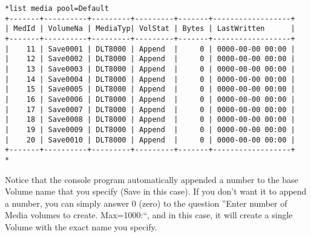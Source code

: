 \footnotesize
\begin{verbatim}
*list media pool=Default
+-------+----------+---------+---------+-------+------------------+
| MedId | VolumeNa | MediaTyp| VolStat | Bytes | LastWritten      |
+-------+----------+---------+---------+-------+------------------+
|    11 | Save0001 | DLT8000 | Append  |     0 | 0000-00-00 00:00 |
|    12 | Save0002 | DLT8000 | Append  |     0 | 0000-00-00 00:00 |
|    13 | Save0003 | DLT8000 | Append  |     0 | 0000-00-00 00:00 |
|    14 | Save0004 | DLT8000 | Append  |     0 | 0000-00-00 00:00 |
|    15 | Save0005 | DLT8000 | Append  |     0 | 0000-00-00 00:00 |
|    16 | Save0006 | DLT8000 | Append  |     0 | 0000-00-00 00:00 |
|    17 | Save0007 | DLT8000 | Append  |     0 | 0000-00-00 00:00 |
|    18 | Save0008 | DLT8000 | Append  |     0 | 0000-00-00 00:00 |
|    19 | Save0009 | DLT8000 | Append  |     0 | 0000-00-00 00:00 |
|    20 | Save0010 | DLT8000 | Append  |     0 | 0000-00-00 00:00 |
+-------+----------+---------+---------+-------+------------------+
*
\end{verbatim}
\normalsize

Notice that the console program automatically appended a number to the base
Volume name that you specify (Save in this case). If you don't want it to
append a number, you can simply answer 0 (zero) to the question ''Enter number
of Media volumes to create. Max=1000:``, and in this case, it will create a
single Volume with the exact name you specify. 
